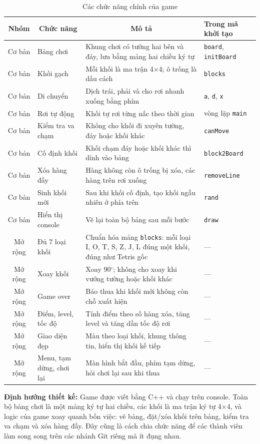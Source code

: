 \documentclass[a4paper]{article}
\begin{document}
\begin{table}[H]
\centering

\begin{tabularx}{\linewidth}{|c|p{2.8cm}|X|>{\centering\arraybackslash}p{2.7cm}|}
\hline
\textbf{Nhóm} & \multicolumn{1}{c|}{\textbf{Chức năng}} & \multicolumn{1}{c|}{\textbf{Mô tả}} & \textbf{Trong mã khởi tạo} \\ \hline
Cơ bản & Bảng chơi & Khung chơi có tường hai bên và đáy, lưu bằng mảng hai chiều ký tự & \texttt{board}, \texttt{initBoard} \\ \hline
Cơ bản & Khối gạch & Mỗi khối là ma trận 4$\times$4; ô trống là dấu cách & \texttt{blocks} \\ \hline
Cơ bản & Di chuyển & Dịch trái, phải và cho rơi nhanh xuống bằng phím & \texttt{a}, \texttt{d}, \texttt{x} \\ \hline
Cơ bản & Rơi tự động & Khối tự rơi từng nấc theo thời gian & vòng lặp \texttt{main} \\ \hline
Cơ bản & Kiểm tra va chạm & Không cho khối đi xuyên tường, đáy hoặc khối khác & \texttt{canMove} \\ \hline
Cơ bản & Cố định khối & Khối chạm đáy hoặc khối khác thì dính vào bảng & \texttt{block2Board} \\ \hline
Cơ bản & Xóa hàng đầy & Hàng không còn ô trống bị xóa, các hàng trên rơi xuống & \texttt{removeLine} \\ \hline
Cơ bản & Sinh khối mới & Sau khi khối cố định, tạo khối ngẫu nhiên ở phía trên & \texttt{rand} \\ \hline
Cơ bản & Hiển thị console & Vẽ lại toàn bộ bảng sau mỗi bước & \texttt{draw} \\ \hline
Mở rộng & Đủ 7 loại khối & Chuẩn hóa mảng \texttt{blocks}: mỗi loại I, O, T, S, Z, J, L đúng một khối, đúng như Tetris gốc & --- \\ \hline
Mở rộng & Xoay khối & Xoay 90$^\circ$; không cho xoay khi vướng tường hoặc khối khác & --- \\ \hline
Mở rộng & Game over & Báo thua khi khối mới không còn chỗ xuất hiện & --- \\ \hline
Mở rộng & Điểm, level, tốc độ & Tính điểm theo số hàng xóa, tăng level và tăng dần tốc độ rơi & --- \\ \hline
Mở rộng & Giao diện đẹp & Màu theo loại khối, khung thông tin, hiển thị khối kế tiếp & --- \\ \hline
Mở rộng & Menu, tạm dừng, chơi lại & Màn hình bắt đầu, phím tạm dừng, hỏi chơi lại sau khi thua & --- \\ \hline
\end{tabularx}
\vspace{8pt}
\caption{Các chức năng chính của game}
\label{tab:chucnang}
\end{table}
\textbf{Định hướng thiết kế:} Game được viết bằng C++ và chạy trên console. Toàn bộ bảng chơi là một mảng ký tự hai chiều, các khối là ma trận ký tự 4$\times$4, và logic của game xoay quanh bốn việc: vẽ bảng, đặt/xóa khối trên bảng, kiểm tra va chạm và xóa hàng đầy. Đây cũng là cách chia chức năng để các thành viên làm song song trên các nhánh Git riêng mà ít đụng nhau.
\end{document}
